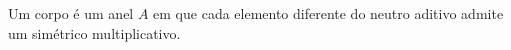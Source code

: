\documentclass[../main.tex]{subfiles}
\begin{document}
\begin{defi}\label{agb-def-corpo}
    Um corpo é um anel $A$ em que cada elemento diferente do neutro aditivo admite um simétrico multiplicativo.
\end{defi}

\end{document}
